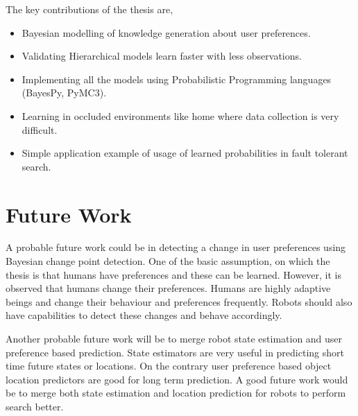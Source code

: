 The key contributions of the thesis are,
\begin{itemize}
	\item Bayesian modelling of knowledge generation about user preferences.
	\item Validating Hierarchical models learn faster with less observations. 
	\item Implementing all the models using Probabilistic Programming languages (BayesPy, PyMC3). 
	\item Learning in occluded environments like home where data collection is very difficult.
	\item Simple application example of usage of learned probabilities in fault tolerant search.
\end{itemize}


\section{Future Work}

A probable future work could be in detecting a change in user preferences using Bayesian change point detection. One of the basic assumption, on which the thesis is that humans have preferences and these can be learned. However, it is observed that humans change their preferences. Humans are highly adaptive beings and change their behaviour and preferences frequently. Robots should also have capabilities to detect these changes and behave accordingly. 

Another probable future work  will be to merge robot state estimation and user preference based prediction. State estimators are very useful in predicting short time future states or locations. On the contrary user preference based object location predictors are good for long term prediction. A good future work would be to merge both state estimation and location prediction for robots to perform search better.
